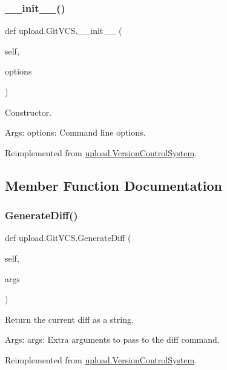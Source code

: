 \subsubsection{\texorpdfstring{\_\_init\_\_()}{\_\_init\_\_()}\hspace{0.1cm}{\footnotesize\ttfamily [2/2]}}
{\footnotesize\ttfamily def upload.\+Git\+V\+C\+S.\+\_\+\+\_\+init\+\_\+\+\_\+ (\begin{DoxyParamCaption}\item[{}]{self,  }\item[{}]{options }\end{DoxyParamCaption})}

\begin{DoxyVerb}Constructor.

Args:
  options: Command line options.
\end{DoxyVerb}
 

Reimplemented from \mbox{\hyperlink{classupload_1_1VersionControlSystem_ace97e5785a2b40011404ae6fbb956ecf}{upload.\+Version\+Control\+System}}.



\subsection{Member Function Documentation}
\mbox{\label{classupload_1_1GitVCS_a3ebfc01cebc9b585706ad3f4389a8833}} 
\subsubsection{\texorpdfstring{GenerateDiff()}{GenerateDiff()}\hspace{0.1cm}{\footnotesize\ttfamily [1/2]}}
{\footnotesize\ttfamily def upload.\+Git\+V\+C\+S.\+Generate\+Diff (\begin{DoxyParamCaption}\item[{}]{self,  }\item[{}]{args }\end{DoxyParamCaption})}

\begin{DoxyVerb}Return the current diff as a string.

Args:
  args: Extra arguments to pass to the diff command.
\end{DoxyVerb}
 

Reimplemented from \mbox{\hyperlink{classupload_1_1VersionControlSystem_aa5eb260c96e7016dab36b5fc136c9f49}{upload.\+Version\+Control\+System}}.

